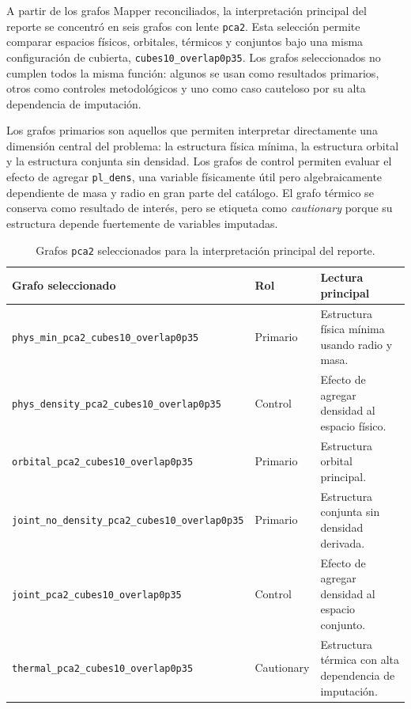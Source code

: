 A partir de los grafos Mapper reconciliados, la interpretación principal del reporte se concentró en seis grafos con lente \texttt{pca2}. Esta selección permite comparar espacios físicos, orbitales, térmicos y conjuntos bajo una misma configuración de cubierta, \texttt{cubes10\_overlap0p35}. Los grafos seleccionados no cumplen todos la misma función: algunos se usan como resultados primarios, otros como controles metodológicos y uno como caso cauteloso por su alta dependencia de imputación.

Los grafos primarios son aquellos que permiten interpretar directamente una dimensión central del problema: la estructura física mínima, la estructura orbital y la estructura conjunta sin densidad. Los grafos de control permiten evaluar el efecto de agregar \texttt{pl\_dens}, una variable físicamente útil pero algebraicamente dependiente de masa y radio en gran parte del catálogo. El grafo térmico se conserva como resultado de interés, pero se etiqueta como \textit{cautionary} porque su estructura depende fuertemente de variables imputadas.

\begin{table}[H]
\centering
\small
\begin{tabular}{p{}p{}p{}}
\toprule
\textbf{Grafo seleccionado} & \textbf{Rol} & \textbf{Lectura principal} \\
\midrule
\texttt{phys\_min\_pca2\_cubes10\_overlap0p35} & Primario & Estructura física mínima usando radio y masa. \\
\texttt{phys\_density\_pca2\_cubes10\_overlap0p35} & Control & Efecto de agregar densidad al espacio físico. \\
\texttt{orbital\_pca2\_cubes10\_overlap0p35} & Primario & Estructura orbital principal. \\
\texttt{joint\_no\_density\_pca2\_cubes10\_overlap0p35} & Primario & Estructura conjunta sin densidad derivada. \\
\texttt{joint\_pca2\_cubes10\_overlap0p35} & Control & Efecto de agregar densidad al espacio conjunto. \\
\texttt{thermal\_pca2\_cubes10\_overlap0p35} & Cautionary & Estructura térmica con alta dependencia de imputación. \\
\bottomrule
\end{tabular}
\caption{Grafos \texttt{pca2} seleccionados para la interpretación principal del reporte.}
\label{tab:selected_pca2_graphs}
\end{table}

